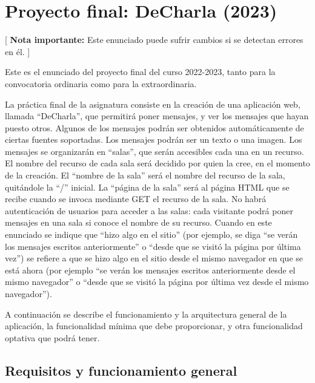 \section{Proyecto final: DeCharla (2023)}
\label{practica-final-2023-05}

[ \textbf{Nota importante:} Este enunciado puede sufrir cambios si se detectan errores en él. ]

Este es el enunciado del proyecto final del curso 2022-2023, tanto para la convocatoria ordinaria como para la extraordinaria.

La práctica final de la asignatura consiste en la creación de una aplicación web, llamada ``DeCharla'', que permitirá poner mensajes, y ver los mensajes que hayan puesto otros. Algunos de los mensajes podrán ser obtenidos automáticamente de ciertas fuentes soportadas. Los mensajes podrán ser un texto o una imagen. Los mensajes se organizarán en ``salas'', que serán accesibles cada una en un recurso. El nombre del recurso de cada sala será decidido por quien la cree, en el momento de la creación. El ``nombre de la sala'' será el nombre del recurso de la sala, quitándole la ``/'' inicial. La ``página de la sala'' será al página HTML que se recibe cuando se invoca mediante GET el recurso de la sala. No habrá autenticación de usuarios para acceder a las salas: cada visitante podrá poner mensajes en una sala si conoce el nombre de su recurso. Cuando en este enunciado se indique que ``hizo algo en el sitio'' (por ejemplo, se diga ``se verán los mensajes escritos anteriormente'' o ``desde que se visitó la página por última vez'') se refiere a que se hizo algo en el sitio desde el mismo navegador en que se está ahora (por ejemplo ``se verán los mensajes escritos anteriormente desde el mismo navegador'' o ``desde que se visitó la página por última vez desde el mismo navegador'').

A continuación se describe el funcionamiento y la arquitectura general de la aplicación, la funcionalidad mínima que debe proporcionar, y otra funcionalidad optativa que podrá tener.

\subsection{Requisitos y funcionamiento general}


